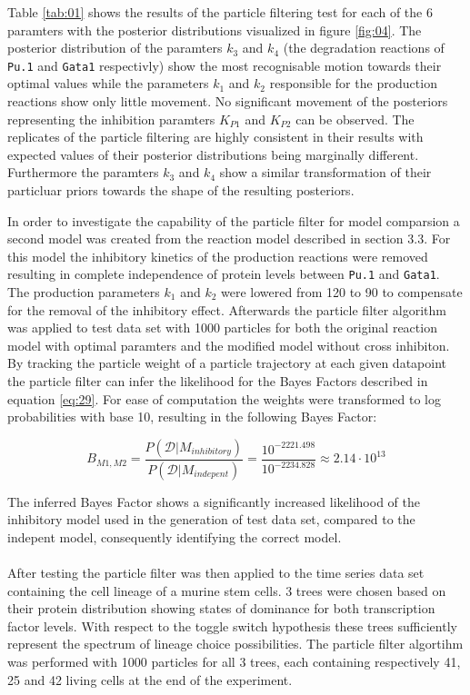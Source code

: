 \documentclass{bioinfo}
\begin{document}
Table \ref{tab:01} shows the results of the particle filtering test for each of the 6 paramters with the posterior distributions visualized in figure \ref{fig:04}. The posterior distribution of the paramters $k_3$ and $k_4$ (the degradation reactions of \texttt{Pu.1} and \texttt{Gata1} respectivly) show the most recognisable motion towards their optimal values while the parameters $k_1$ and $k_2$ responsible for the production reactions show only little movement. No significant movement of the posteriors representing the inhibition paramters $K_{P1}$ and $K_{P2}$ can be observed. The replicates of the particle filtering are highly consistent in their results with expected values of their posterior distributions being marginally different. Furthermore the paramters $k_3$ and $k_4$ show a similar transformation of their particluar priors towards the shape of the resulting posteriors.


In order to investigate the capability of the particle filter for model comparsion a second model was created from the reaction model described in section 3.3. For this model the inhibitory kinetics of the production reactions were removed resulting in complete independence of protein levels between \texttt{Pu.1} and \texttt{Gata1}. The production parameters $k_1$ and $k_2$ were lowered from 120 to 90 to compensate for the removal of the inhibitory effect. Afterwards the particle filter algorithm was applied to test data set with 1000 particles for both the original reaction model with optimal paramters and the modified model without cross inhibiton. By tracking the particle weight of a particle trajectory at each given datapoint the particle filter can infer the likelihood for the Bayes Factors described in equation \ref{eq:29}. For ease of computation the weights were transformed to log probabilities with base 10, resulting in the following Bayes Factor:


\begin{equation}
B_{M1, M2} = \frac{P(\mathcal{D} | M_{inhibitory})}{P(\mathcal{D} | M_{indepent})} = \frac{10^{-2221.498}}{10^{-2234.828}} \approx 2.14 \cdot 10^{13} \label{eq:30}
\end{equation}

The inferred Bayes Factor shows a significantly increased likelihood of the inhibitory model used in the generation of test data set, compared to the indepent model, consequently identifying the correct model.
\\
\\ %
After testing the particle filter was then applied to the time series data set containing the cell lineage of a murine stem cells. 3 trees were chosen based on their protein distribution showing states of dominance for both transcription factor levels. With respect to the toggle switch hypothesis these trees sufficiently represent the spectrum of lineage choice possibilities. The particle filter algortihm was performed with 1000 particles for all 3 trees, each containing respectively 41, 25 and 42 living cells at the end of the experiment.
\end{document}
